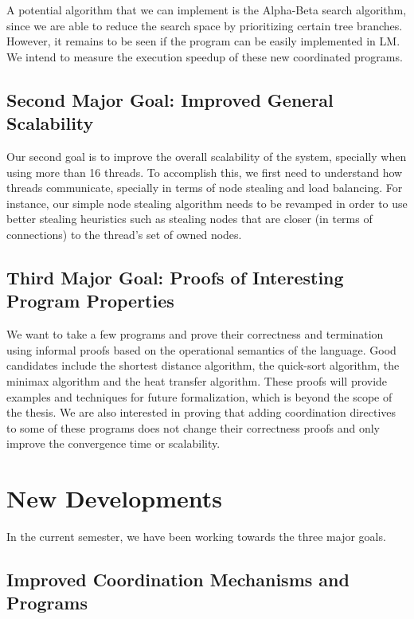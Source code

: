 \documentclass[10pt]{article}
\begin{document}
A potential algorithm that we can implement is the Alpha-Beta search algorithm,
since we are able to reduce the search space by prioritizing certain tree branches.
However, it remains to be seen if the program can be easily implemented in LM.
We intend to measure the execution speedup of these new coordinated programs.

\subsection{Second Major Goal: Improved General Scalability}

Our second goal is to improve the overall scalability of the system, specially
when using more than 16 threads. To accomplish this, we first need to understand
how threads communicate, specially in terms of node stealing and load balancing.
For instance, our simple node stealing algorithm needs to be revamped in order
to use better stealing heuristics such as stealing nodes that are closer (in
terms of connections) to the thread's set of owned nodes.

\subsection{Third Major Goal: Proofs of Interesting Program Properties}


We want to take a few programs and prove their correctness and
termination using informal proofs based on the operational semantics of the
language. Good candidates include the shortest distance algorithm, the
quick-sort algorithm, the minimax algorithm and the heat transfer algorithm.
These proofs will provide examples and techniques for future formalization, which
is beyond the scope of the thesis. We are also interested in proving that
adding coordination directives to some of these programs does not change their
correctness proofs and only improve the convergence time or scalability.

\section{New Developments}

In the current semester, we have been working towards the three major goals.

\subsection{Improved Coordination Mechanisms and Programs}
\end{document}
